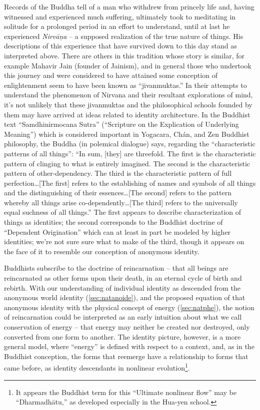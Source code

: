 \documentclass[pra,twocolumn,groupedaddress,10pt]{revtex4}
\theoremstyle{definition}
\begin{document}
Records of the Buddha tell of a man who withdrew from princely life and, having witnessed and experienced much suffering, ultimately took to meditating in solitude for a prolonged period in an effort to understand, until at last he experienced \textit{Nirv\={a}\d{n}a} -- a supposed realization of the true nature of things. His descriptions of this experience that have survived down to this day stand as interpreted above. There are others in this tradition whose story is similar, for example Mahavir Jain (founder of Jainism), and in general those who undertook this journey and were considered to have attained some conception of enlightenment seem to have been known as ``jivanmuktas.'' In their attempts to understand the phenomenon of Nirvana and their resultant explorations of mind, it's not unlikely that these jivanmuktas and the philosophical schools founded by them may have arrived at ideas related to identity architecture. In the Buddhist text ``Samdhinirmocana Sutra'' (``Scripture on the Explication of Underlying Meaning'') which is considered important in Yogacara, Ch\'{a}n, and Zen Buddhist philosophy, the Buddha (in polemical dialogue) says, regarding the ``characteristic patterns of all things'': ``In sum, [they] are threefold. The first is the characteristic pattern of clinging to what is entirely imagined. The second is the characteristic pattern of other-dependency. The third is the characteristic pattern of full perfection\ldots [The first] refers to the establishing of names and symbols of all things and the distinguishing of their essences\ldots[The second] refers to the pattern whereby all things arise co-dependently\ldots[The third] refers to the universally equal suchness of all things.''\cite{samdhinirmocana} The first appears to describe characterization of things as identities; the second corresponds to the Buddhist doctrine of ``Dependent Origination'' which can at least in part be modeled by higher identities; we're not sure sure what to make of the third, though it appears on the face of it to resemble our conception of anonymous identity.

Buddhists subscribe to the doctrine of reincarnation -- that all beings are reincarnated as other forms upon their death, in an eternal cycle of birth and rebirth. With our understanding of individual identity as descended from the anonymous world identity (\autoref{sec:natanoide}), and the proposed equation of that anonymous identity with the physical concept of energy (\autoref{sec:natphe}), the notion of reincarnation could be interpreted as an early intuition about what we call conservation of energy -- that energy may neither be created nor destroyed, only converted from one form to another. The identity picture, however, is a more general model, where ``energy'' is defined with respect to a context, and, as in the Buddhist conception, the forms that reemerge have a relationship to forms that came before, as identity descendants in nonlinear evolution\footnote{It appears the Buddhist term for this ``Ultimate nonlinear flow'' may be ``Dharmadh\={a}tu,'' as developed especially in the Hua-yen school\cite{dharmadhatu}.}.
\end{document}
